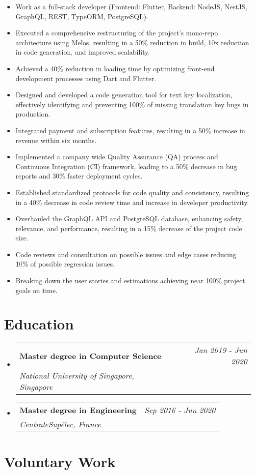 \documentclass[a4paper,11pt]{article}
\newcommand{\cvHeading}[3]{
\vspace{0.5mm}\item
    \begin{tabularx}{0.98\textwidth}[t]{X r}
        \textbf{#1} & \textit{\footnotesize{#2}} \\
        \textit{\footnotesize{#3}} &  {}\\
    \end{tabularx}
    \vspace{-2.4mm}
}
\newcommand{\cvHeadingListStart}{\begin{itemize}[leftmargin=*,labelsep=0mm]}
\newcommand{\cvHeadingListEnd}{\end{itemize}\vspace{2mm}}
\newcommand{\cvItemListStart}{\begin{justify}\begin{itemize}[leftmargin=1ex, rightmargin=2ex, noitemsep, labelsep=1.2mm, itemsep=0mm]\small}
\newcommand{\cvItemListEnd}{\end{itemize}\end{justify}\vspace{-2mm}}
\begin{document}
\cvItemListStart
\item Work as a full-stack developer (Frontend: Flutter, Backend: NodeJS, NestJS, GraphQL, REST, TypeORM, PostgreSQL).
\item Executed a comprehensive restructuring of the project's mono-repo architecture using Melos, resulting in a 50\% reduction in build, 10x reduction in code generation, and improved scalability.
\item Achieved a 40\% reduction in loading time by optimizing front-end development processes using Dart and Flutter.
\item Designed and developed a code generation tool for text key localization, effectively identifying and preventing 100\% of missing translation key bugs in production.
\item Integrated payment and subscription features, resulting in a 50\% increase in revenue within six months.
\item Implemented a company wide Quality Assurance (QA) process and Continuous Integration (CI) framework, leading to a 50\% decrease in bug reports and 30\% faster deployment cycles.
\item Established standardized protocols for code quality and consistency, resulting in a 40\% decrease in code review time and increase in developer productivity.
\item Overhauled the GraphQL API and PostgreSQL database, enhancing safety, relevance, and performance, resulting in a 15\% decrease of the project code size.
\item Code reviews and consultation on possible issues and edge cases reducing 10\% of possible regression issues.
\item Breaking down the user stories and estimations achieving near 100\% project goals on time.
\cvItemListEnd



\section{\textbf{Education}}
\cvHeadingListStart
\cvHeading
{Master degree in Computer Science}{Jan 2019 - Jun 2020}
{National University of Singapore, Singapore}
\cvHeading
{Master degree in Engineering}{Sep 2016 - Jun 2020}
{CentraleSupélec, France}
\cvHeadingListEnd

\section{\textbf{Voluntary Work}}
\end{document}
